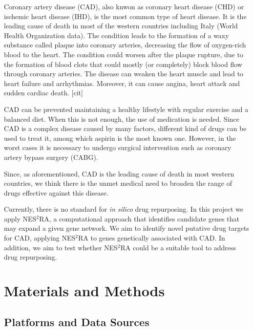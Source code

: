 \documentclass[fleqn,10pt]{SelfArx} %
\begin{document}
Coronary artery disease (CAD), also knwon as coronary heart disease (CHD) or ischemic heart disease (IHD), is the most common type of heart disease. It is the leading cause of death in most of the western countries including Italy (World Health Organization data). The condition leads to the formation of a waxy substance called plaque into coronary arteries, decreasing the flow of oxygen-rich blood to the heart. The condition could worsen after the plaque rupture, due to the formation of blood clots that could mostly (or completely) block blood flow through coronary arteries. The disease can weaken the heart muscle and lead to heart failure and arrhythmias. Moreover, it can cause angina, heart attack and sudden cardiac death. [cit]

CAD can be prevented maintaining a healthy lifestyle with regular exercise and a balanced diet. When this is not enough, the use of medication is needed. Since CAD is a complex disease caused by many factors, different kind of drugs can be used to treat it, among which aspirin is the most known one. However, in the worst cases it is necessary to undergo surgical intervention such as coronary artery bypass surgery (CABG).

Since, as aforementioned, CAD is the leading cause of death in most western countries, we think there is the unmet medical need to broaden the range of drugs effective against this disease.

Currently, there is no standard for \textit{in silico} drug repurposing. In this project we apply NES$^2$RA\cite{NES2RA}, a computational approach that identifies candidate genes that may expand a given gene network. We aim to identify novel putative drug targets for CAD, applying NES$^2$RA to genes genetically associated with CAD. In addition, we aim to test whether NES$^2$RA could be a suitable tool to address drug repurposing.

\section*{Materials and Methods}

\subsection*{Platforms and Data Sources}
\end{document}
